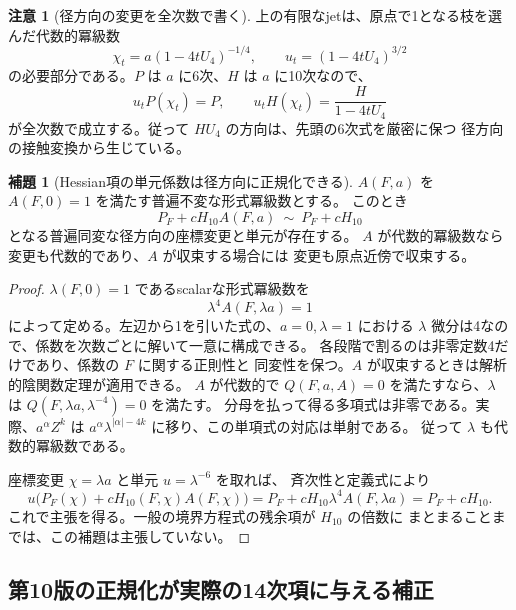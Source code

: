 \documentclass[a4paper,11pt]{ltjsarticle}
\theoremstyle{definition}
\newtheorem{lemma}[theorem]{補題}
\newtheorem{remark}[theorem]{注意}
\begin{document}
\begin{remark}[径方向の変更を全次数で書く]
上の有限なjetは、原点で1となる枝を選んだ代数的冪級数
\[
 \chi_t=a(1-4tU_4)^{-1/4},\qquad
 u_t=(1-4tU_4)^{3/2}
\]
の必要部分である。$P$ は $a$ に6次、$H$ は $a$ に10次なので、
\[
 u_tP(\chi_t)=P,
 \qquad u_tH(\chi_t)=\frac{H}{1-4tU_4}
\]
が全次数で成立する。従って $HU_4$ の方向は、先頭の6次式を厳密に保つ
径方向の接触変換から生じている。
\end{remark}

\begin{lemma}[Hessian項の単元係数は径方向に正規化できる]
\label{lem:v11-radial-hessian-unit}
$A(F,a)$ を $A(F,0)=1$ を満たす普遍不変な形式冪級数とする。
このとき
\[
 P_F+cH_{10}A(F,a)\ \sim\ P_F+cH_{10}
\]
となる普遍同変な径方向の座標変更と単元が存在する。
$A$ が代数的冪級数なら変更も代数的であり、$A$ が収束する場合には
変更も原点近傍で収束する。
\end{lemma}
\begin{proof}
$\lambda(F,0)=1$ であるscalarな形式冪級数を
\[
 \lambda^4 A(F,\lambda a)=1
\]
によって定める。左辺から1を引いた式の、$a=0,\lambda=1$ における
$\lambda$ 微分は4なので、係数を次数ごとに解いて一意に構成できる。
各段階で割るのは非零定数4だけであり、係数の $F$ に関する正則性と
同変性を保つ。$A$ が収束するときは解析的陰関数定理が適用できる。
$A$ が代数的で $Q(F,a,A)=0$ を満たすなら、$\lambda$ は
$Q(F,\lambda a,\lambda^{-4})=0$ を満たす。
分母を払って得る多項式は非零である。実際、$a^\alpha Z^k$ は
$a^\alpha\lambda^{|\alpha|-4k}$ に移り、この単項式の対応は単射である。
従って $\lambda$ も代数的冪級数である。

座標変更 $\chi=\lambda a$ と単元 $u=\lambda^{-6}$ を取れば、
斉次性と定義式により
\[
 u\bigl(P_F(\chi)+cH_{10}(F,\chi)A(F,\chi)\bigr)
 =P_F+cH_{10}\lambda^4A(F,\lambda a)=P_F+cH_{10}.
\]
これで主張を得る。一般の境界方程式の残余項が $H_{10}$ の倍数に
まとまることまでは、この補題は主張していない。
\end{proof}

\subsection{第10版の正規化が実際の14次項に与える補正}
\label{subsec:v11-actual-fourteen-correction}
\end{document}
